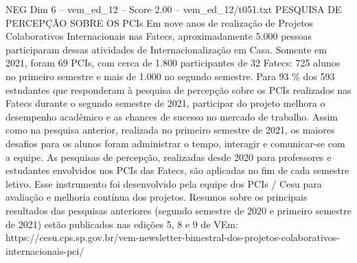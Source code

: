 \begin{textsample}{NEG Dim 6 – vem\_ed\_12 – Score 2.00 – vem\_ed\_12/t051.txt}  \label{ex:f6_neg_149}
PESQUISA DE PERCEPÇÃO SOBRE OS PCIs Em nove anos de realização de Projetos Colaborativos Internacionais nas Fatecs, aproximadamente 5.000 pessoas participaram dessas atividades de Internacionalização em Casa.
Somente em 2021, foram 69 PCIs, com cerca de 1.800 participantes de 32 Fatecs: 725 alunos no primeiro semestre e mais de 1.000 no segundo semestre.
Para 93 \% dos 593 estudantes que responderam à pesquisa de percepção sobre os PCIs realizados nas Fatecs durante o segundo semestre de 2021, participar do projeto melhora o desempenho acadêmico e as chances de sucesso no mercado de trabalho.
Assim como na pesquisa anterior, realizada no primeiro semestre de 2021, os maiores desafios para os alunos foram administrar o tempo, interagir e comunicar-se com a equipe.
As pesquisas de percepção, realizadas desde 2020 para professores e estudantes envolvidos nos PCIs das Fatecs, são aplicadas no fim de cada semestre letivo.
Esse instrumento foi desenvolvido pela equipe dos PCIs / Cesu para avaliação e melhoria contínua dos projetos.
Resumos sobre os principais resultados das pesquisas anteriores (segundo semestre de 2020 e primeiro semestre de 2021) estão publicados nas edições 5, 8 e 9 de VEm: https://cesu.cps.sp.gov.br/vem-newsletter-bimestral-dos-projetos-colaborativos-internacionais-pci/

\end{textsample}
